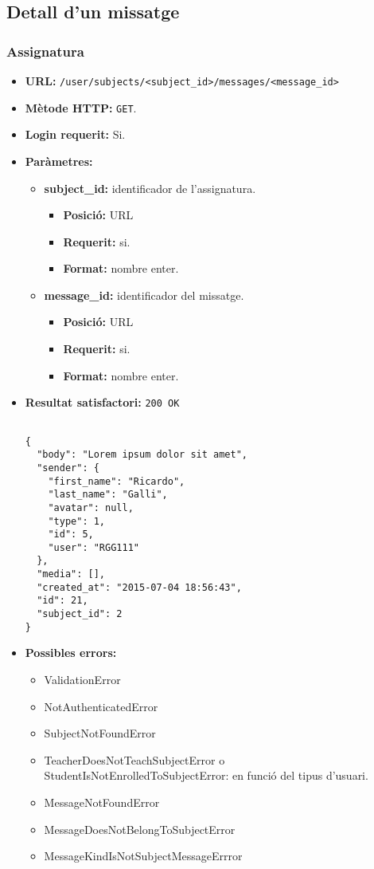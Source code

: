 \subsection{Detall d'un missatge}

	\subsubsection{Assignatura}
	\begin{itemize}
\item \textbf{\ac{URL}:} \texttt{/user/subjects/<subject\_id>/messages/<message\_id>}
\item \textbf{Mètode \ac{HTTP}: } \texttt{GET}.
\item \textbf{Login requerit:} Si.
\item \textbf{Paràmetres:}
	\begin{itemize}
		\item \textbf{subject\_id:} identificador de l'assignatura.
		\begin{itemize}
			\item \textbf{Posició:} \ac{URL}
			\item \textbf{Requerit:} si.
			\item \textbf{Format:} nombre enter.
		\end{itemize}
		\item \textbf{message\_id:} identificador del missatge.
		\begin{itemize}
			\item \textbf{Posició:} \ac{URL}
			\item \textbf{Requerit:} si.
			\item \textbf{Format:} nombre enter.
		\end{itemize}
	\end{itemize}
\item \textbf{Resultat satisfactori:} \texttt{200 OK}
	\begin{verbatim}
	
{
  "body": "Lorem ipsum dolor sit amet",
  "sender": {
    "first_name": "Ricardo",
    "last_name": "Galli",
    "avatar": null,
    "type": 1,
    "id": 5,
    "user": "RGG111"
  },
  "media": [],
  "created_at": "2015-07-04 18:56:43",
  "id": 21,
  "subject_id": 2
}
	\end{verbatim}
\item \textbf{Possibles errors:}
	\begin{itemize}
		\item ValidationError
		\item NotAuthenticatedError
		\item SubjectNotFoundError
		\item TeacherDoesNotTeachSubjectError o StudentIsNotEnrolledToSubjectError: en funció del tipus d'usuari.
		\item MessageNotFoundError
		\item MessageDoesNotBelongToSubjectError
		\item MessageKindIsNotSubjectMessageErrror

	\end{itemize}

	\end{itemize}
	
